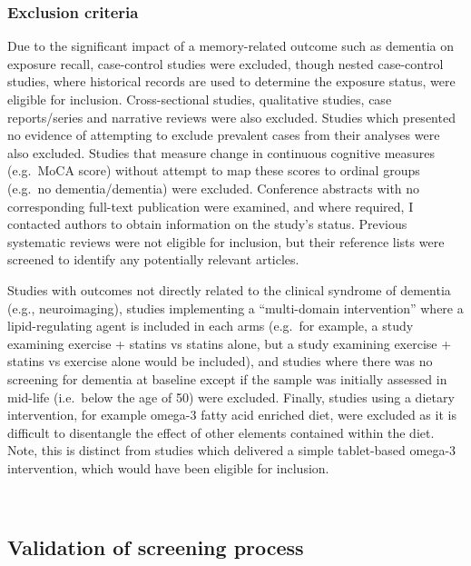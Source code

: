 \documentclass[a4paper, twoside]{templates/ociamthesis}
\begin{document}
\hypertarget{exclusion-criteria}{%
\subsubsection{Exclusion criteria}\label{exclusion-criteria}}

Due to the significant impact of a memory-related outcome such as dementia on exposure recall, case-control studies were excluded, though nested case-control studies, where historical records are used to determine the exposure status, were eligible for inclusion. Cross-sectional studies, qualitative studies, case reports/series and narrative reviews were also excluded. Studies which presented no evidence of attempting to exclude prevalent cases from their analyses were also excluded. Studies that measure change in continuous cognitive measures (e.g.~MoCA score) without attempt to map these scores to ordinal groups (e.g.~no dementia/dementia) were excluded. Conference abstracts with no corresponding full-text publication were examined, and where required, I contacted authors to obtain information on the study's status. Previous systematic reviews were not eligible for inclusion, but their reference lists were screened to identify any potentially relevant articles.

Studies with outcomes not directly related to the clinical syndrome of dementia (e.g., neuroimaging), studies implementing a ``multi-domain intervention'' where a lipid-regulating agent is included in each arms (e.g.~for example, a study examining exercise + statins vs statins alone, but a study examining exercise + statins vs exercise alone would be included), and studies where there was no screening for dementia at baseline except if the sample was initially assessed in mid-life (i.e.~below the age of 50) were excluded. Finally, studies using a dietary intervention, for example omega-3 fatty acid enriched diet, were excluded as it is difficult to disentangle the effect of other elements contained within the diet. Note, this is distinct from studies which delivered a simple tablet-based omega-3 intervention, which would have been eligible for inclusion.

~

\hypertarget{validation-of-screening-process}{%
\subsection{Validation of screening process}\label{validation-of-screening-process}}
\end{document}
